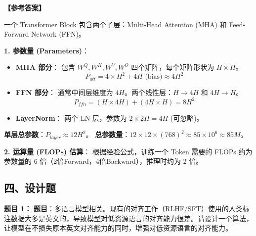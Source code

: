 \documentclass[a4paper,11pt]{article}
\newenvironment{question}[1]
    {\vspace{0.5cm}\noindent\textbf{题目 #1：}}
    {\vspace{0.2cm}}
\newenvironment{answer}
    {\noindent\textbf{【参考答案】}\par\small\color{blue}}
    {\par\vspace{0.5cm}\normalcolor}
\begin{document}
\begin{answer}
一个 Transformer Block 包含两个子层：Multi-Head Attention (MHA) 和 Feed-Forward Network (FFN)。

\textbf{1. 参数量 (Parameters)}：
\begin{itemize}
    \item \textbf{MHA 部分}：
    包含 $W^Q, W^K, W^V, W^O$ 四个矩阵，每个矩阵形状为 $H \times H$。
    $$ P_{att} = 4 \times H^2 + 4H \text{ (bias)} \approx 4H^2 $$
    \item \textbf{FFN 部分}：
    通常中间层维度为 $4H$。两个线性层：$H \to 4H$ 和 $4H \to H$。
    $$ P_{ffn} = (H \times 4H) + (4H \times H) = 8H^2 $$
    \item \textbf{LayerNorm}：
    两个 LN 层，参数为 $2 \times 2H = 4H$ (可忽略)。
\end{itemize}
\textbf{单层总参数}：$P_{layer} \approx 12H^2$。
\textbf{总参数量}：$12 \times 12 \times (768)^2 \approx 85 \times 10^6 \approx 85M$。

\textbf{2. 运算量 (FLOPs) 估算}：
根据经验公式，训练一个 Token 需要的 FLOPs 约为参数量的 6 倍（2倍Forward，4倍Backward），推理时约为 2 倍。
\end{answer}

\subsection{四、设计题}

\begin{question}{1}
\textbf{题目}：多语言模型相关。现有的对齐工作（RLHF/SFT）使用的人类标注数据大多是英文的，导致模型对低资源语言的对齐能力很差。请设计一个算法，让模型在不损失原本英文对齐能力的同时，增强对低资源语言的对齐能力。
\end{question}
\end{document}
